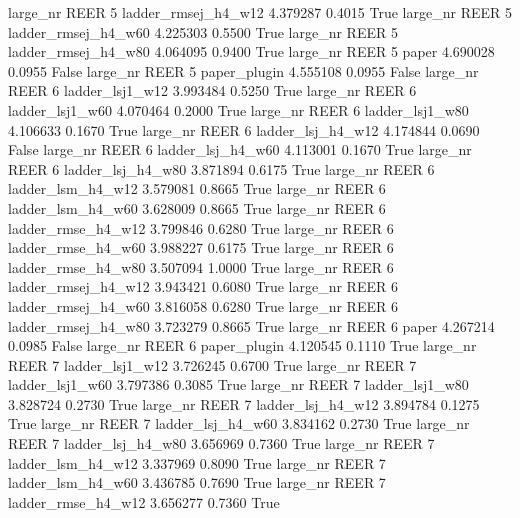   large_nr     REER                 5 ladder_rmsej_h4_w12   4.379287      0.4015    True
  large_nr     REER                 5 ladder_rmsej_h4_w60   4.225303      0.5500    True
  large_nr     REER                 5 ladder_rmsej_h4_w80   4.064095      0.9400    True
  large_nr     REER                 5               paper   4.690028      0.0955   False
  large_nr     REER                 5        paper_plugin   4.555108      0.0955   False
  large_nr     REER                 6     ladder_lsj1_w12   3.993484      0.5250    True
  large_nr     REER                 6     ladder_lsj1_w60   4.070464      0.2000    True
  large_nr     REER                 6     ladder_lsj1_w80   4.106633      0.1670    True
  large_nr     REER                 6   ladder_lsj_h4_w12   4.174844      0.0690   False
  large_nr     REER                 6   ladder_lsj_h4_w60   4.113001      0.1670    True
  large_nr     REER                 6   ladder_lsj_h4_w80   3.871894      0.6175    True
  large_nr     REER                 6   ladder_lsm_h4_w12   3.579081      0.8665    True
  large_nr     REER                 6   ladder_lsm_h4_w60   3.628009      0.8665    True
  large_nr     REER                 6  ladder_rmse_h4_w12   3.799846      0.6280    True
  large_nr     REER                 6  ladder_rmse_h4_w60   3.988227      0.6175    True
  large_nr     REER                 6  ladder_rmse_h4_w80   3.507094      1.0000    True
  large_nr     REER                 6 ladder_rmsej_h4_w12   3.943421      0.6080    True
  large_nr     REER                 6 ladder_rmsej_h4_w60   3.816058      0.6280    True
  large_nr     REER                 6 ladder_rmsej_h4_w80   3.723279      0.8665    True
  large_nr     REER                 6               paper   4.267214      0.0985   False
  large_nr     REER                 6        paper_plugin   4.120545      0.1110    True
  large_nr     REER                 7     ladder_lsj1_w12   3.726245      0.6700    True
  large_nr     REER                 7     ladder_lsj1_w60   3.797386      0.3085    True
  large_nr     REER                 7     ladder_lsj1_w80   3.828724      0.2730    True
  large_nr     REER                 7   ladder_lsj_h4_w12   3.894784      0.1275    True
  large_nr     REER                 7   ladder_lsj_h4_w60   3.834162      0.2730    True
  large_nr     REER                 7   ladder_lsj_h4_w80   3.656969      0.7360    True
  large_nr     REER                 7   ladder_lsm_h4_w12   3.337969      0.8090    True
  large_nr     REER                 7   ladder_lsm_h4_w60   3.436785      0.7690    True
  large_nr     REER                 7  ladder_rmse_h4_w12   3.656277      0.7360    True
